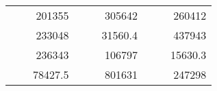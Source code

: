 \begin{table}[H]
\begin{tabular}{|ccrccrccc}
\rowcolor[HTML]{DAE8FC} 
\multicolumn{1}{|c|}{\cellcolor[HTML]{FFFFC7}}                                & \multicolumn{1}{c|}{\cellcolor[HTML]{DAE8FC}}                      & \multicolumn{1}{r|}{\cellcolor[HTML]{DAE8FC}201355}    & \multicolumn{1}{c|}{\cellcolor[HTML]{FFFFC7}}                                & \multicolumn{1}{c|}{\cellcolor[HTML]{DAE8FC}}                       & \multicolumn{1}{r|}{\cellcolor[HTML]{DAE8FC}305642}    & \multicolumn{1}{c|}{\cellcolor[HTML]{FFFFC7}}                                & \multicolumn{1}{c|}{\cellcolor[HTML]{DAE8FC}}                      & \multicolumn{1}{r|}{\cellcolor[HTML]{DAE8FC}260412}    \\ \cline{3-3} \cline{6-6} \cline{9-9} 
\multicolumn{1}{|c|}{\cellcolor[HTML]{FFFFC7}}                                & \multicolumn{1}{c|}{\cellcolor[HTML]{DAE8FC}}                      & \multicolumn{1}{r|}{\cellcolor[HTML]{DDFDFF}233048}    & \multicolumn{1}{c|}{\cellcolor[HTML]{FFFFC7}}                                & \multicolumn{1}{c|}{\cellcolor[HTML]{DAE8FC}}                       & \multicolumn{1}{r|}{\cellcolor[HTML]{DDFDFF}31560.4}   & \multicolumn{1}{c|}{\cellcolor[HTML]{FFFFC7}}                                & \multicolumn{1}{c|}{\cellcolor[HTML]{DAE8FC}}                      & \multicolumn{1}{r|}{\cellcolor[HTML]{DDFDFF}437943}    \\ \cline{3-3} \cline{6-6} \cline{9-9} 
\rowcolor[HTML]{DAE8FC} 
\multicolumn{1}{|c|}{\cellcolor[HTML]{FFFFC7}}                                & \multicolumn{1}{c|}{\cellcolor[HTML]{DAE8FC}}                      & \multicolumn{1}{r|}{\cellcolor[HTML]{DAE8FC}236343}    & \multicolumn{1}{c|}{\cellcolor[HTML]{FFFFC7}}                                & \multicolumn{1}{c|}{\cellcolor[HTML]{DAE8FC}}                       & \multicolumn{1}{r|}{\cellcolor[HTML]{DAE8FC}106797}    & \multicolumn{1}{c|}{\cellcolor[HTML]{FFFFC7}}                                & \multicolumn{1}{c|}{\cellcolor[HTML]{DAE8FC}}                      & \multicolumn{1}{r|}{\cellcolor[HTML]{DAE8FC}15630.3}   \\ \cline{3-3} \cline{6-6} \cline{9-9} 
\multicolumn{1}{|c|}{\cellcolor[HTML]{FFFFC7}}                                & \multicolumn{1}{c|}{\cellcolor[HTML]{DAE8FC}}                      & \multicolumn{1}{r|}{\cellcolor[HTML]{DDFDFF}78427.5}   & \multicolumn{1}{c|}{\cellcolor[HTML]{FFFFC7}}                                & \multicolumn{1}{c|}{\cellcolor[HTML]{DAE8FC}}                       & \multicolumn{1}{r|}{\cellcolor[HTML]{DDFDFF}801631}    & \multicolumn{1}{c|}{\cellcolor[HTML]{FFFFC7}}                                & \multicolumn{1}{c|}{\cellcolor[HTML]{DAE8FC}}                      & \multicolumn{1}{r|}{\cellcolor[HTML]{DDFDFF}247298}    \\ \cline{3-3} \cline{6-6} \cline{9-9} 

\end{tabular}
\end{table}
